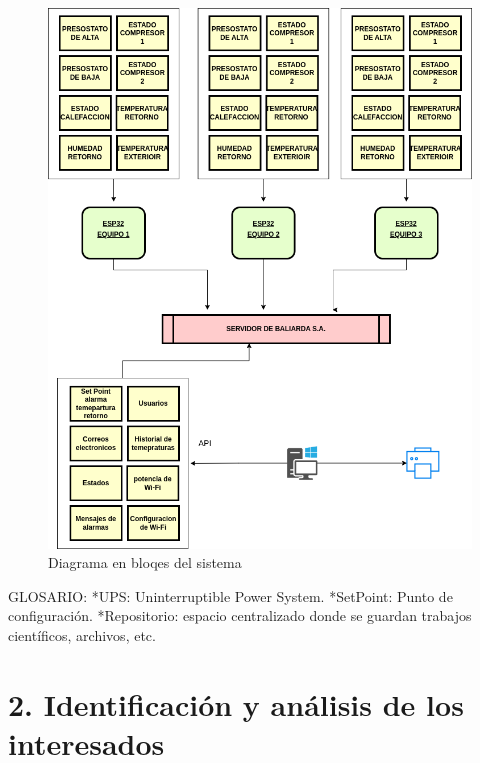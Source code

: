 \documentclass[
11pt, %
codirector, %
]{charter}
\begin{document}
\begin{figure}[H]
\centering 
\includegraphics[width=1.1\textwidth]{./Figuras/DIAGRAMA_1.png}
\caption{Diagrama en bloqes del sistema}
\label{fig:diagBloques}
\end{figure}

\vspace{25px}





GLOSARIO:
*UPS: Uninterruptible Power System.
*SetPoint: Punto de configuración.
*Repositorio: espacio centralizado donde se guardan trabajos científicos, archivos, etc.



\section{2. Identificación y análisis de los interesados}
\label{sec:interesados}
\end{document}
